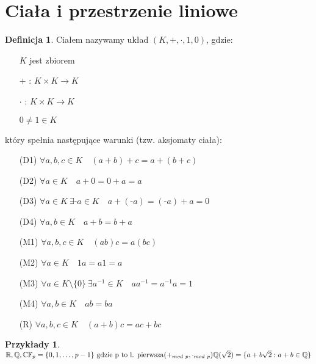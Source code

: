 \documentclass[12pt,a4paper]{article}
\newcommand{\RR}{\mathbb{R}}
\theoremstyle{plain}
\theoremstyle{definition}
\theoremstyle{definition}
\newtheorem{df}{Definicja}[section]
\theoremstyle{definition}
\theoremstyle{definition}
\theoremstyle{definition}
\theoremstyle{definition}
\newtheorem*{przy}{Przykłady}
\theoremstyle{definition}
\theoremstyle{definition}
\begin{document}
\section{Ciała i przestrzenie liniowe}

\begin{df} 
Ciałem nazywamy układ $(K, + ,\cdot,1,0)$, gdzie:
    \begin{itemize} 
        \item[] $K$ jest zbiorem
        \item[$+$]: $K \times K \rightarrow K$
        \item[$\cdot$]: $K \times K \rightarrow K$
        \item[] $0 \neq 1 \in K$ 
    \end{itemize} 
    który spełnia następujące warunki (tzw. aksjomaty ciała):
    \begin{itemize}
        \item[(D1)] $\forall a, b, c \in K  \quad (a+b)+c = a+(b+c)$
        \item[(D2)] $\forall a \in K \quad a+0 = 0+a = a$
        \item[(D3)] $\forall a \in K \ \exists \text{-}a \in K \quad a + (\text{-}a) = (\text{-}a) + a = 0$
        \item[(D4)] $\forall a, b \in K \quad a+b = b+a$
        \item[(M1)] $\forall a, b, c \in K \quad (ab)c = a(bc) $
        \item[(M2)] $\forall a \in K \quad 1a = a1 = a$
        \item[(M3)] $\forall a \in K \setminus \{0\} \ \exists a^{-1} \in K \quad aa^{-1} = a^{-1}a = 1$
        \item[(M4)] $\forall a, b \in K \quad ab = ba$
        \item[(R)] $ \forall a,b, c \in K \quad (a+b)c = ac + bc $
    \end{itemize}
\end{df}

\begin{przy} 
    ~\\
    $ \RR, \mathbb{Q}, \mathbb{C} \\ 
    \mathbb{F}_p = \{0, 1, \dots, p-1\} \text{ gdzie p to l. pierwsza} (+_{mod\ p}, \cdot_{mod\ p})\\ 
    \mathbb{Q}(\sqrt{2}) = \{a+b\sqrt{2} : a+b \in \mathbb{Q}\}$
\end{przy}
\end{document}
